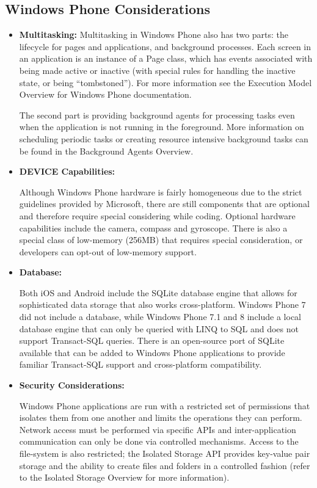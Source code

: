 \subsection{Windows Phone Considerations}

\begin{itemize}
\item \textbf{Multitasking: }
Multitasking in Windows Phone also has two parts: the lifecycle for pages and applications, and background processes. Each screen in an application is an instance of a Page class, which has events associated with being made active or inactive (with special rules for handling the inactive state, or being “tombstoned”). For more information see the Execution Model Overview for Windows Phone documentation.

The second part is providing background agents for processing tasks even when the application is not running in the foreground. More information on scheduling periodic tasks or creating resource intensive background tasks can be found in the Background Agents Overview.


\item \textbf{DEVICE Capabilities: }

Although Windows Phone hardware is fairly homogeneous due to the strict guidelines provided by Microsoft, there are still components that are optional and therefore require special considering while coding. Optional hardware capabilities include the camera, compass and gyroscope. There is also a special class of low-memory (256MB) that requires special consideration, or developers can opt-out of low-memory support.


\item \textbf{Database: }

Both iOS and Android include the SQLite database engine that allows for sophisticated data storage that also works cross-platform. Windows Phone 7 did not include a database, while Windows Phone 7.1 and 8 include a local database engine that can only be queried with LINQ to SQL and does not support Transact-SQL queries. There is an open-source port of SQLite available that can be added to Windows Phone applications to provide familiar Transact-SQL support and cross-platform compatibility.


\item \textbf{Security Considerations: }

Windows Phone applications are run with a restricted set of permissions that isolates them from one another and limits the operations they can perform. Network access must be performed via specific APIs and inter-application communication can only be done via controlled mechanisms. Access to the file-system is also restricted; the Isolated Storage API provides key-value pair storage and the ability to create files and folders in a controlled fashion (refer to the Isolated Storage Overview for more information).


\end{itemize}

